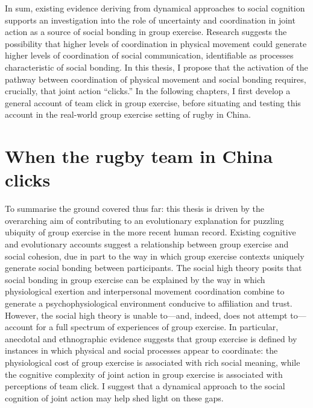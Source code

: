 \begin{CJK}{UTF8}{gbsn}
In sum, existing evidence deriving from dynamical approaches to social cognition supports an investigation into the role of uncertainty and coordination in joint action as a source of social bonding in group exercise.  Research suggests the possibility that higher levels of coordination in physical movement could generate higher levels of coordination of social communication, identifiable as processes characteristic of social bonding.  In this thesis, I propose that the activation of the pathway between coordination of physical movement and social bonding requires, crucially, that joint action  ``clicks.''
In the following chapters, I first develop a general account of team click in group exercise,  before situating and testing this account in the real-world group exercise setting of rugby in China.



\section{When the rugby team in China clicks}
To summarise the ground covered thus far: this thesis is driven by the overarching aim of contributing to an evolutionary explanation for puzzling ubiquity of group exercise in the more recent human record.  Existing cognitive and evolutionary accounts suggest a relationship between group exercise and social cohesion, due in part to the way in which group exercise contexts uniquely generate social bonding between participants.  The social high theory posits that social bonding in group exercise can be explained by the way in which physiological exertion and interpersonal movement coordination combine to generate a psychophysiological environment conducive to affiliation and trust.  However, the social high theory is unable to---and, indeed, does not attempt to---account for a full spectrum of experiences of group exercise.  In particular, anecdotal and ethnographic evidence suggests that group exercise is defined by instances in which physical and social processes appear to coordinate: the physiological cost of group exercise is associated with rich social meaning, while the cognitive complexity of joint action in group exercise is associated with perceptions of team click.  I suggest that a dynamical approach to the social cognition of joint action may help shed light on these gaps.


\end{CJK}
